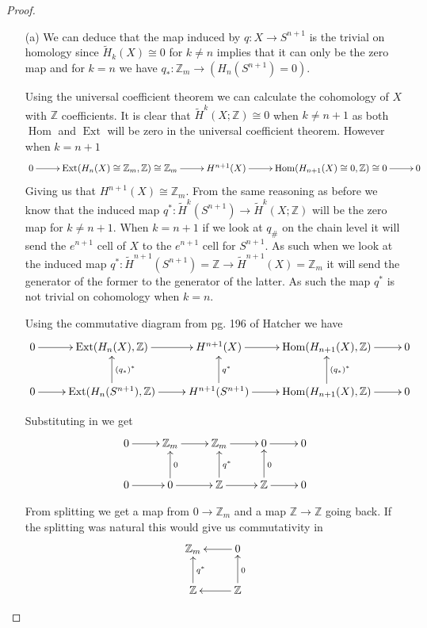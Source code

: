 \documentclass[10pt]{article}
\newcommand{\bb}[1]{\mathbb{#1}}
\newcommand{\rH}{\widetilde{H}}
\DeclareMathOperator{\Ext}{Ext}
\DeclareMathOperator{\Hom}{Hom}
\theoremstyle{remark}
\begin{document}
\begin{proof}
  \begin{itemize}
  \item[(a)]  We can deduce that the map induced by $q:X\rightarrow S^{n+1}$ is the trivial on homology
    since $\rH_k(X)\cong 0$ for $k\neq n$ implies that it can only be the zero map and for
    $k=n$ we have $q_*:\bb{Z}_m\rightarrow (H_n(S^{n+1})=0)$.

    Using the universal coefficient theorem we can calculate the cohomology of
    $X$ with $\bb{Z}$ coefficients. It is clear that $\rH^k(X;\bb{Z})\cong 0$ when
    $k\neq n+1$ as both $\Hom$ and $\Ext$ will be zero in the universal coefficient
    theorem. However when $k=n+1$
    \[
      \xymatrix{
        0 \ar[r] & \Ext(H_{n}(X)\cong \bb{Z}_m,\bb{Z})\cong \bb{Z}_m \ar[r] & H^{n+1}(X) \ar[r] & \Hom(H_{n+1}(X)\cong 0,\bb{Z})\cong 0 \ar[r] & 0\\
      }
    \]
    Giving us that $H^{n+1}(X)\cong \bb{Z}_m$. From the same reasoning as before we know
    that the induced map $q^*:\rH^k(S^{n+1})\rightarrow\rH^k(X;\bb{Z})$ will be the zero map
    for $k\neq n+1$. When $k=n+1$ if we look at $q_{\#}$ on the chain level it
    will send the $e^{n+1}$ cell of $X$ to the $e^{n+1}$ cell for $S^{n+1}$. As
    such when we look at the induced map $q^*:\rH^{n+1}(S^{n+1})=\bb{Z}\rightarrow \rH^{n+1}(X)=\bb{Z}_m$
    it will send the generator of the former to the generator of the latter. As
    such the map $q^*$ is not trivial on cohomology when $k=n$.

    Using the commutative diagram from pg. 196 of Hatcher we have
    \[
      \xymatrix{
        0 \ar[r] & \Ext(H_n(X),\bb{Z}) \ar[r] & H^{n+1}(X) \ar[r] & \Hom(H_{n+1}(X),\bb{Z}) \ar[r] & 0\\
        0 \ar[r] & \Ext(H_n(S^{n+1}),\bb{Z}) \ar[r] \ar[u]_{(q_*)^*} & H^{n+1}(S^{n+1}) \ar[r] \ar[u]_{q^*} & \Hom(H_{n+1}(X),\bb{Z}) \ar[r]\ar[u]_{(q_*)^*} & 0
      }
    \]

    Substituting in we get
    \[
      \xymatrix{
        0 \ar[r] & \bb{Z}_m \ar[r] & \bb{Z}_m \ar[r] & 0 \ar[r] & 0\\
        0 \ar[r] & 0 \ar[r] \ar[u]_0& \bb{Z} \ar[r] \ar[u]_{q^*}& \bb{Z} \ar[r] \ar[u]_0 & 0\\
      }
    \]

    From splitting we get a map from $0\rightarrow \bb{Z}_m$ and a map $\bb{Z}\rightarrow\bb{Z}$ going back. If
    the splitting was natural this would give us commutativity in
    \[
      \xymatrix{
        \bb{Z}_m & \ar[l] 0\\
        \bb{Z} \ar[u]_{q^*} & \ar[l] \ar[u]_0 \bb{Z}\\
      }
    \]


\end{itemize}
\end{proof}
\end{document}
